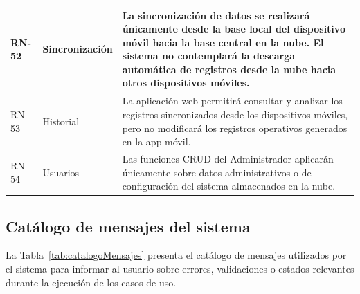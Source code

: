 \begin{longtable}{|>{\centering\arraybackslash}m{1.8cm}|>{\centering\arraybackslash}m{2.5cm}|m{9.5cm}|}
RN-52 & Sincronización & La sincronización de datos se realizará únicamente desde la base local del dispositivo móvil hacia la base central en la nube. El sistema no contemplará la descarga automática de registros desde la nube hacia otros dispositivos móviles.\\
\hline

RN-53 & Historial & La aplicación web permitirá consultar y analizar los registros sincronizados desde los dispositivos móviles, pero no modificará los registros operativos generados en la app móvil.\\
\hline

RN-54 & Usuarios & Las funciones CRUD del Administrador aplicarán únicamente sobre datos administrativos o de configuración del sistema almacenados en la nube.\\
\hline

\end{longtable}

\subsection{Catálogo de mensajes del sistema}
La Tabla~\ref{tab:catalogoMensajes} presenta el catálogo de mensajes utilizados por el sistema para informar al usuario sobre errores, validaciones o estados relevantes durante la ejecución de los casos de uso.

